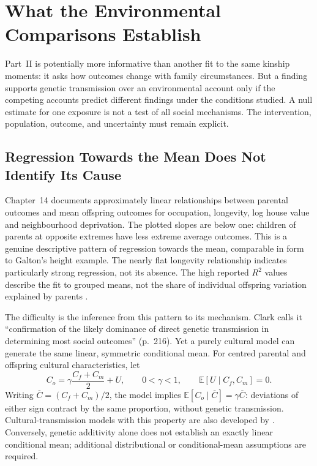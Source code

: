 \section{What the Environmental Comparisons Establish}
\label{sec:environmental-evidence}
Part~II is potentially more informative than another fit to the same
kinship moments: it asks how outcomes change with family circumstances.
But a finding supports genetic transmission over an environmental account
only if the competing accounts predict different findings under the
conditions studied. A null estimate for one exposure is not a test of all
social mechanisms. The intervention, population, outcome, and uncertainty
must remain explicit.

\subsection{Regression Towards the Mean Does Not Identify Its Cause}
\label{sec:regression-mean}

Chapter~14 documents approximately linear relationships between parental
outcomes and mean offspring outcomes for occupation, longevity, log house
value and neighbourhood deprivation. The plotted slopes are below one:
children of parents at opposite extremes have less extreme average
outcomes. This is a genuine descriptive pattern of regression towards the
mean, comparable in form to Galton's height example. The nearly flat
longevity relationship indicates particularly strong regression, not its
absence. The high reported $R^2$ values describe the fit to grouped means,
not the share of individual offspring variation explained by parents
\citep[pp.~210--216]{Clark2026}.

The difficulty is the inference from this pattern to its mechanism.
Clark calls it ``confirmation of the likely dominance of direct genetic
transmission in determining most social outcomes'' (p.~216). Yet a purely
cultural model can generate the same linear, symmetric conditional mean.
For centred parental and offspring cultural characteristics, let
\[
 C_o=\gamma\frac{C_f+C_m}{2}+U,\qquad
 0<\gamma<1,\qquad \mathbb E[U\mid C_f,C_m]=0.
\]
Writing $\overline C=(C_f+C_m)/2$, the model implies
$\mathbb E[C_o\mid\overline C]=\gamma\overline C$: deviations of either
sign contract by the same proportion, without genetic transmission.
Cultural-transmission models with this property are also developed by
\citet{OttoEtAl1994}. Conversely, genetic additivity alone does not establish an exactly linear
conditional mean; additional distributional or conditional-mean assumptions
are required.

